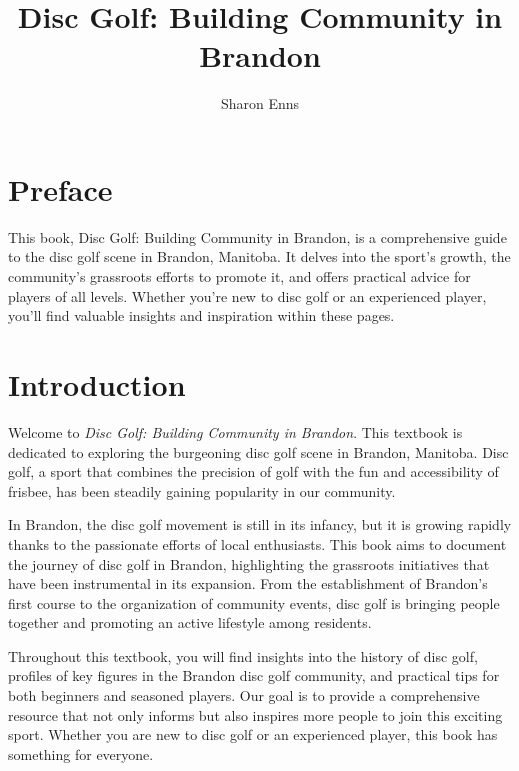 \documentclass[
  openany]{book}
\title{Disc Golf: Building Community in Brandon}
\author{Sharon Enns}
\date{}
\begin{document}
\maketitle

{
\setcounter{tocdepth}{1}
\tableofcontents
}
\chapter{Preface}\label{preface}

This book, Disc Golf: Building Community in Brandon, is a comprehensive guide to the disc golf scene in Brandon, Manitoba. It delves into the sport's growth, the community's grassroots efforts to promote it, and offers practical advice for players of all levels. Whether you're new to disc golf or an experienced player, you'll find valuable insights and inspiration within these pages.

\chapter{Introduction}\label{introduction}

Welcome to \emph{Disc Golf: Building Community in Brandon}. This textbook is dedicated to exploring the burgeoning disc golf scene in Brandon, Manitoba. Disc golf, a sport that combines the precision of golf with the fun and accessibility of frisbee, has been steadily gaining popularity in our community.

In Brandon, the disc golf movement is still in its infancy, but it is growing rapidly thanks to the passionate efforts of local enthusiasts. This book aims to document the journey of disc golf in Brandon, highlighting the grassroots initiatives that have been instrumental in its expansion. From the establishment of Brandon's first course to the organization of community events, disc golf is bringing people together and promoting an active lifestyle among residents.

Throughout this textbook, you will find insights into the history of disc golf, profiles of key figures in the Brandon disc golf community, and practical tips for both beginners and seasoned players. Our goal is to provide a comprehensive resource that not only informs but also inspires more people to join this exciting sport. Whether you are new to disc golf or an experienced player, this book has something for everyone.
\end{document}
